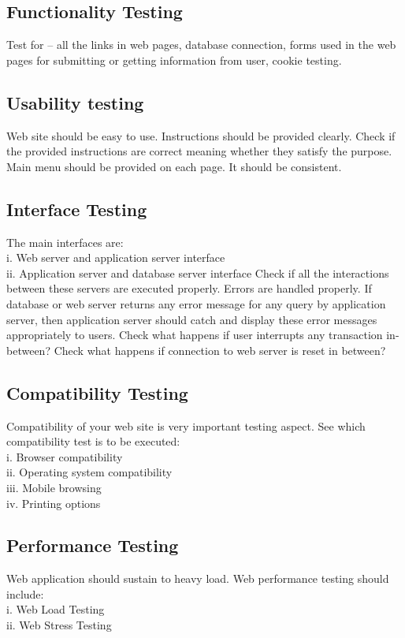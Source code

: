 \subsection{Functionality Testing}
Test for – all the links in web pages, database connection, forms used in the web pages for
submitting or getting information from user, cookie testing.

\subsection{Usability testing}
Web site should be easy to use. Instructions should be provided clearly. Check if the provided
instructions are correct meaning whether they satisfy the purpose. Main menu should be
provided on each page. It should be consistent.

\subsection{Interface Testing}
The main interfaces are:
\\ i. Web server and application server interface
\\ ii. Application server and database server interface
Check if all the interactions between these servers are executed properly. Errors are handled
properly. If database or web server returns any error message for any query by application
server, then application server should catch and display these error messages appropriately to
users. Check what happens if user interrupts any transaction in-between? Check what happens
if connection to web server is reset in between?
\subsection{Compatibility Testing}
Compatibility of your web site is very important testing aspect. See which compatibility test is
to be executed:
\\i. Browser compatibility
\\ii. Operating system compatibility
\\iii. Mobile browsing
\\iv. Printing options
\subsection{Performance Testing}
Web application should sustain to heavy load. Web performance testing should include:
\\i. Web Load Testing
\\ii. Web Stress Testing

